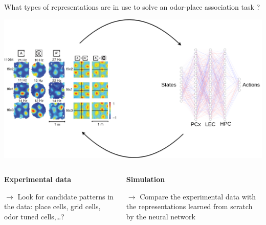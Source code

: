 \documentclass[bigger]{beamer}
\begin{document}
\begin{frame}[label={sec:org12bfbe5}]{What types of representations are in use to solve an odor-place association task ?}
\begin{center}
\includegraphics[height=0.4\textheight]{img/exp-vs-simu.drawio.png}
\end{center}
\vspace{-3em}
\begin{columns}
\begin{column}[t]{0.5\columnwidth}
\begin{center}
\textbf{Experimental data}
\end{center}
\(\to\) Look for candidate patterns in the data: place cells, grid cells, odor tuned cells,\dots{}?
\end{column}
\begin{column}[t]{0.5\columnwidth}
\begin{center}
\textbf{Simulation}
\end{center}
\(\to\) Compare the experimental data with the representations learned from scratch by the neural network

\end{column}
\end{columns}
\end{frame}
\end{document}
